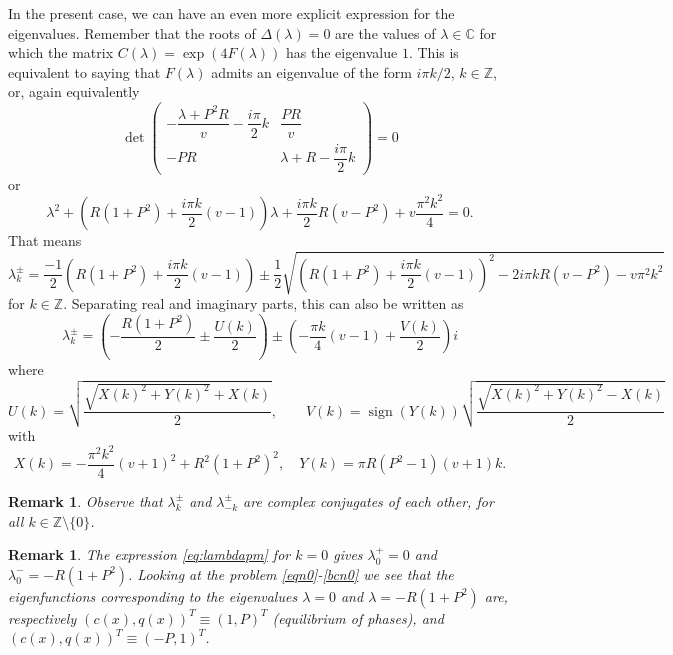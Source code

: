 \documentclass[a4paper]{article}
\newtheorem{rem}[thm]{Remark}
\newcommand{\Z}{\ensuremath{\mathbb{Z}}}
\def\C{{\mathbb{C}}}
\def\C{{\mathbb{C}}}
\numberwithin{equation}{section}
\begin{document}
In the present case, we can have an even more explicit expression for the eigenvalues. Remember that the roots of $\Delta(\lambda)=0$ are the values of $\lambda\in\C$
for which the matrix $C(\lambda)=\exp(4F(\lambda))$ has the eigenvalue $1$. This is equivalent to saying that $F(\lambda)$ admits an eigenvalue of the form  $i\pi k/{2}$, $k\in\Z$, or, again equivalently
$$
\det
\begin{pmatrix}
-\dfrac{\lambda+P^2R}{v}-\dfrac{i\pi}{2}k&\dfrac{PR}{v}\\-PR&\lambda+R-\dfrac{i\pi}{2}k
\end{pmatrix}
=0
$$
or
$$\lambda^2+\left(R(1+P^2)+\dfrac{i\pi k}{2}(v-1)\right) \lambda+
\dfrac{i\pi k}{2}R\left(v-P^2\right)+v\dfrac{\pi^2 k^2}{4}=0.
$$
That means
\begin{equation}\label{eq:lambdapm}
\lambda_k^{\pm}=\dfrac{-1}{2} \left(R(1+P^2)+\dfrac{i\pi k}{2}(v-1)\right) \pm
\dfrac{1}{2}\sqrt{\left(R(1+P^2)+\dfrac{i\pi k}{2}({v-1})\right)^2-2i\pi k R\left(v-{P^2}\right)-v\pi^2 k^2}
\end{equation}
for $k\in\mathbb{Z}$.
Separating real and imaginary parts, this can also be written as
\begin{equation}\label{eq:lamReIm}
\lambda_k^{\pm}= \left( -\frac{R(1+P^2)}{2} \pm \frac{U(k)}{2}\right) \pm \left( -\frac{\pi k}{4}(v-1) + \frac{V(k)}{2}\right) i
\end{equation}
where
\begin{equation}\label{eq:UV}
U(k) = \sqrt{\frac{\sqrt{X(k)^2+Y(k)^2}+X(k)}{2}},
\qquad
V(k) = \operatorname{sign}(Y(k))\sqrt{\frac{\sqrt{X(k)^2+Y(k)^2}-X(k)}{2}}
\end{equation}
with
\begin{equation}\label{eq:XY}
X(k) =  - \frac{\pi^2 k^2}{4}(v+1)^2 +R^2(1+P^2)^2, \quad
Y(k) = \pi  R (P^2 - 1)(v+1)k.
\end{equation}
\begin{rem}
Observe that $\lambda_k^{\pm}$ and $\lambda_{-k}^{\pm}$ are complex conjugates of each other, for all $k\in\mathbb{Z}\setminus\{0\}$.
\end{rem}
\begin{rem}\label{rem:limcase} The expression \eqref{eq:lambdapm} for $k=0$ gives $\lambda_0^+=0$ and $\lambda_0^-=-R(1+P^2)$. Looking at the problem \eqref{eqn0}-\eqref{bcn0} we see that the eigenfunctions corresponding to the eigenvalues $\lambda=0$ and $\lambda=-R(1+P^2)$ are, respectively $(c(x),q(x))^T\equiv (1,P)^T$ (equilibrium of phases), and $(c(x),q(x))^T\equiv (-P,1)^T$.
\end{rem}
\end{document}

